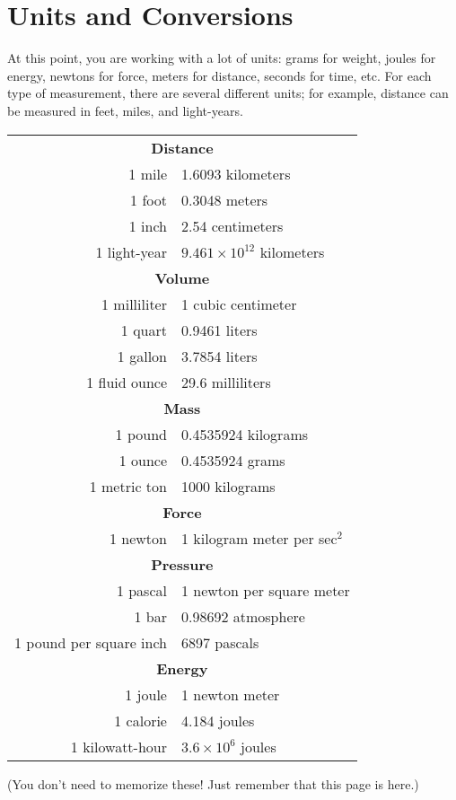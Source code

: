 \chapter{Units and Conversions}

At this point, you are working with a lot of units: grams for weight,
joules for energy, newtons for force, meters for distance, seconds for
time, etc. For each type of measurement, there are several different
units; for example, distance can be measured in feet, miles,
and light-years.

\begin{mdframed}[style=important, frametitle={Some Equalencies}]

\begin{tabular}{r | l}
  \hline
  \multicolumn{2}{c}{\textbf{Distance}}\\
  1 mile & 1.6093 kilometers \\
  1 foot & 0.3048 meters \\
  1 inch & 2.54 centimeters \\
  1 light-year & $9.461 \times 10^{12}$ kilometers\\
  \hline
  \multicolumn{2}{c}{\textbf{Volume}}\\
  1 milliliter & 1 cubic centimeter \\
  1 quart & 0.9461 liters \\
  1 gallon & 3.7854 liters \\
  1 fluid ounce & 29.6 milliliters \\
  \hline
  \multicolumn{2}{c}{\textbf{Mass}}\\
  1 pound & 0.4535924 kilograms\\
  1 ounce & 0.4535924 grams\\
  1 metric ton & 1000 kilograms \\
  \hline
  \multicolumn{2}{c}{\textbf{Force}}\\
  1 newton & 1 kilogram meter per sec$^2$\\
  \hline
  \multicolumn{2}{c}{\textbf{Pressure}}\\
  1 pascal & 1 newton per square meter \\
  1 bar & 0.98692 atmosphere \\
  1 pound per square inch & 6897 pascals \\
  \hline
  \multicolumn{2}{c}{\textbf{Energy}}\\
  1 joule & 1 newton meter \\
  1 calorie & 4.184 joules \\
  1 kilowatt-hour & $3.6 \times 10^{6}$ joules  \\
\end{tabular}

(You don't need to memorize these! Just remember that this page is here.)

\end{mdframed}

